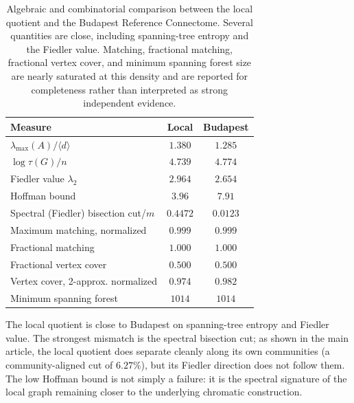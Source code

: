 \documentclass[12pt]{article}
\begin{document}
\begin{table}[t]
\centering
\small
\setlength{\tabcolsep}{4pt}
\begin{tabular}{lcc}
\toprule
Measure & Local & Budapest \\
\midrule
\(\lambda_{\max}(A)/\langle d\rangle\) & \(1.380\) & \(1.285\) \\
\(\log\tau(G)/n\) & \(4.739\) & \(4.774\) \\
Fiedler value \(\lambda_2\) & \(2.964\) & \(2.654\) \\
Hoffman bound & \(3.96\) & \(7.91\) \\
Spectral (Fiedler) bisection cut/\(m\) & \(0.4472\) & \(0.0123\) \\
Maximum matching, normalized & \(0.999\) & \(0.999\) \\
Fractional matching & \(1.000\) & \(1.000\) \\
Fractional vertex cover & \(0.500\) & \(0.500\) \\
Vertex cover, 2-approx. normalized & \(0.974\) & \(0.982\) \\
Minimum spanning forest & \(1014\) & \(1014\) \\
\bottomrule
\end{tabular}
\caption{Algebraic and combinatorial comparison between the local quotient
and the Budapest Reference Connectome.  Several quantities are close,
including spanning-tree entropy and the Fiedler value.  Matching, fractional
matching, fractional vertex cover, and minimum spanning forest size are
nearly saturated at this density and are reported for completeness rather
than interpreted as strong independent evidence.}
\label{tab:local-repair-combinatorial}
\end{table}

The local quotient is close to Budapest on spanning-tree entropy and Fiedler
value.  The strongest mismatch is the spectral bisection cut; as shown in
the main article, the local quotient does separate cleanly along its own
communities (a community-aligned cut of \(6.27\%\)), but its Fiedler
direction does not follow them.  The low Hoffman bound is not simply a failure: it is
the spectral signature of the local graph remaining closer to the underlying
chromatic construction.
\end{document}
